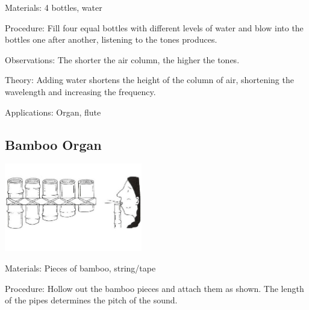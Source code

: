 \begin{multicols}{2}
\begin{description*}
\item[Materials:]{4 bottles, water}
\item[Procedure:]{Fill four equal bottles with different levels of water and blow into the bottles one after another, listening to the tones produces.}
\item[Observations:]{The shorter the air column, the higher the tones.}
\item[Theory:]{Adding water shortens the height of the column of air, shortening the wavelength and increasing the frequency.}
\item[Applications:]{Organ, flute}
\end{description*}

\columnbreak

\subsection{Bamboo Organ} 

\begin{center}
\includegraphics[width=0.45\textwidth]{./img/vso/bamboo-organ.jpg}
\end{center}

\begin{description*}
\item[Materials:]{Pieces of bamboo, string/tape}
\item[Procedure:]{Hollow out the bamboo pieces and attach them as shown. The length of the pipes determines the pitch of the sound.}
\end{description*}


\end{multicols}

